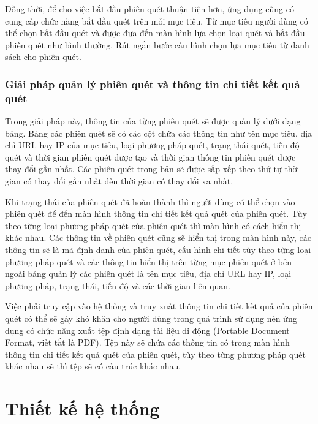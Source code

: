 Đồng thời, để cho việc bắt đầu phiên quét thuận tiện hơn, ứng dụng cũng có cung cấp chức năng bắt đầu quét trên mỗi mục tiêu.
Từ mục tiêu người dùng có thể chọn bắt đầu quét và được đưa đến màn hình lựa chọn loại quét và bắt đầu phiên quét như bình thường.
Rút ngắn bước cấu hình chọn lựa mục tiêu từ danh sách cho phiên quét.

\subsubsection{Giải pháp quản lý phiên quét và thông tin chi tiết kết quả quét}

\tab Trong giải pháp này, thông tin của từng phiên quét sẽ được quản lý dưới dạng bảng.
Bảng các phiên quét sẽ có các cột chứa các thông tin như tên mục tiêu, địa chỉ URL hay IP của mục tiêu, loại phương pháp quét, trạng thái quét, tiến độ quét và thời gian phiên quét được tạo và thời gian thông tin phiên quét được thay đổi gần nhất.
Các phiên quét trong bản sẽ được sắp xếp theo thứ tự thời gian có thay đổi gần nhất đến thời gian có thay đổi xa nhất.
\par

Khi trạng thái của phiên quét đã hoàn thành thì người dùng có thể chọn vào phiên quét để đến màn hình thông tin chi tiết kết quả quét của phiên quét.
Tùy theo từng loại phương pháp quét của phiên quét thì màn hình có cách hiển thị khác nhau.
Các thông tin về phiên quét cũng sẽ hiển thị trong màn hình này, các thông tin sẽ là mã định danh của phiên quét, cấu hình chi tiết tùy theo từng loại phương pháp quét và các thông tin hiển thị trên từng mục phiên quét ở bên ngoài bảng quản lý các phiên quét là tên mục tiêu, địa chỉ URL hay IP, loại phương pháp, trạng thái, tiến độ và các thời gian liên quan.
\par

Việc phải truy cập vào hệ thống và truy xuất thông tin chi tiết kết quả của phiên quét có thể sẽ gây khó khăn cho người dùng trong quá trình sử dụng nên ứng dụng có chức năng xuất tệp định dạng tài liệu di động (Portable Document Format, viết tắt là PDF).
Tệp này sẽ chứa các thông tin có trong màn hình thông tin chi tiết kết quả quét của phiên quét, tùy theo từng phương pháp quét khác nhau sẽ thì tệp sẽ có cấu trúc khác nhau.
\par

\section{Thiết kế hệ thống}

